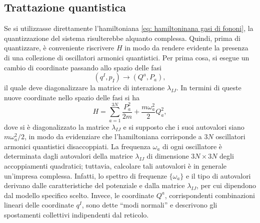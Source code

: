 \subsection{Trattazione quantistica}
Se si utilizzasse direttamente l'hamiltoniana \eqref{eq: hamiltoninana gasi di fononi}, la quantizzazione del sistema risulterebbe alquanto complessa. Quindi, prima di quantizzare, è conveniente riscrivere $H$ in modo da rendere evidente la presenza di una collezione di oscillatori armonici quantistici. Per prima cosa, si esegue un cambio di coordinate passando allo spazio delle fasi
\begin{equation}
    (q^I,p_I) \to (Q^a,P_a),
\end{equation}
il quale deve diagonalizzare la matrice di interazione $\lambda_{IJ}$. In termini di queste nuove coordinate nello spazio delle fasi si ha
\begin{equation}
    H = \sum_{a=1}^{3N}\frac{P_a^2}{2m} + \frac{m\omega^2_a}{2}Q_a^2,
\end{equation}
dove si è diagonalizzato la matrice $\lambda_{IJ}$ e si supposto che i suoi autovalori siano $m\omega_a^2/2$, in modo da evidenziare che l'hamiltoniana corrisponde a $3N$ oscillatori armonici quantistici disaccoppiati. La frequenza $\omega_a$ di ogni oscillatore è determinata dagli autovalori della matrice $\lambda_{IJ}$ di dimensione $3N \times 3N$ degli accoppiamenti quadratici; tuttavia, calcolare tali autovalori è in generale un'impresa complessa. Infatti, lo spettro di frequenze $\{\omega_a\}$ e il tipo di autovalori derivano dalle caratteristiche del potenziale e dalla matrice $\lambda_{IJ}$, per cui dipendono dal modello specifico scelto. Invece, le coordinate $Q^a$, corrispondenti  combinazioni lineari delle coordinate $q^I$, sono dette ``modi normali'' e descrivono gli spostamenti collettivi indipendenti dal reticolo.


